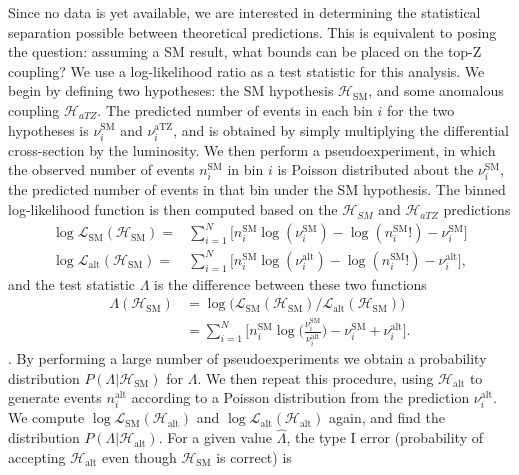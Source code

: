 \documentclass[preprint]{JHEP3} %
\newcommand{\SM}{\mathrm{SM}}
\newcommand{\aTZ}{\mathrm{aTZ}}
\newcommand{\alt}{\mathrm{alt}}
\def\HSM{\mathcal{H}_{\mathrm{SM}}}
\def\Halt{\mathcal{H}_{\mathrm{alt}}}
\begin{document}
Since no data is yet available, we are interested in determining the statistical separation possible between theoretical predictions. This is equivalent to posing the question: assuming a SM result, what bounds can be placed on the top-Z coupling? 
We use a log-likelihood ratio as a test statistic for this analysis. We begin by defining two hypotheses: the SM hypothesis $\mathcal{H}_{\mathrm{SM}}$, and some anomalous coupling $\mathcal{H}_{aTZ}$. The predicted number of events in each bin $i$ for the two hypotheses is $\nu_i^{\mathrm{SM}}$ and $\nu_i^{\aTZ}$, and is obtained by simply multiplying the differential cross-section by the luminosity. We then perform a pseudoexperiment, in which the observed number of events $n_i^{\SM}$ in bin $i$ is Poisson distributed about the $\nu_i^{\mathrm{SM}}$, the predicted number of events in that bin under the SM hypothesis.  The binned log-likelihood function is then computed based on the $\mathcal{H}_{SM}$ and $\mathcal{H}_{aTZ}$ predictions
\begin{equation}
\begin{split}
\log\mathcal{L}_{\SM}(\HSM)   =& \sum_{i=1}^N \bigl[ n_i^{\SM}\log(\nu_i^{\SM}) -\log(n_i^{\SM}!) -\nu_i^{\SM}  \bigr] \\
\log\mathcal{L}_{\alt}(\HSM)  =& \sum_{i=1}^N \bigl[ n_i^{\SM}\log(\nu_i^{\alt})-\log(n_i^{\SM}!) -\nu_i^{\alt} \bigr],
\end{split}
\end{equation}
and the test statistic $\Lambda$ is the difference between these two functions 
\begin{equation}
\begin{split}
\Lambda(\HSM) &= \log \biggl( \mathcal{L}_{\SM}(\HSM) /  \mathcal{L}_{\alt}(\HSM) \biggr)  \\
 & = \sum_{i=1}^N \biggl[ n_i^{\SM}\log \biggl( \frac{\nu_i^{\SM}}{\nu_i^{\alt}} \biggr) -\nu_i^{\SM} + \nu_i^{\alt} \biggr]. 
\end{split}
\end{equation}.
By performing a large number of pseudoexperiments we obtain a probability distribution $P(\Lambda|\HSM)$ for $\Lambda$. We then repeat this procedure, using $\Halt$ to generate events $n_i^{\alt}$ according to a Poisson distribution from the prediction $\nu_i^{\alt}$. We compute $\log\mathcal{L}_{\SM}(\Halt)$ and $\log\mathcal{L}_{\alt}(\Halt)$ again, and find the distribution $P(\Lambda | \Halt)$. For a given value $\hat{\Lambda}$, the type I error (probability of accepting $\mathcal{H}_{\alt}$ even though $\mathcal{H}_{\SM}$ is correct) is
\end{document}
